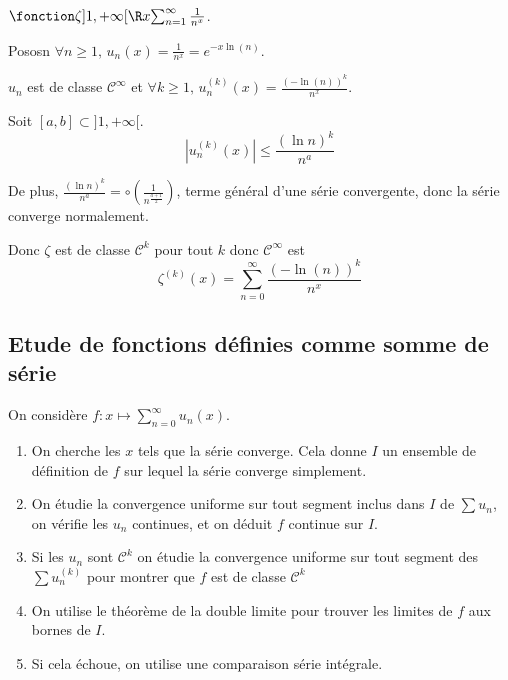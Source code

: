\begin{exemple}
    $\fonction \zeta {]1, + \infty[}{\R} x {\sum_{n = 1}^{\infty} \frac 1 {n^x}}$.

    Pososn $\forall n \geqslant 1, \, u_n(x) = \frac 1 {n^x} = e^{-x \ln(n)}$.

    $u_n$ est de classe $\mathscr {C}^{\infty}$ et $\forall k \geqslant 1, \, u_n^{(k)}(x) = \frac{(- \ln(n))^k}{n^x}$. 

    Soit $[a, b] \subset ]1, +\infty[$.
    $$\left| u_n^{(k)}(x) \right| \leqslant \frac{(\ln n )^k}{n^a}$$

    De plus, $\displaystyle \frac{(\ln n)^k}{n^a} = \circ \left( \frac 1 {n^{\frac{a + 1}{2}}} \right)$, terme 
    général d'une série convergente, donc la série converge normalement. 

    Donc $\zeta$ est de classe $\mathscr{C}^{k}$ pour tout $k$ donc $\mathscr{C}^{\infty}$ est 
    $$\zeta^{(k)}(x) = \sum_{n = 0}^{\infty} \frac{(- \ln(n))^k}{n^x}$$
\end{exemple}

\subsection{Etude de fonctions définies comme somme de série }


On considère $f : \displaystyle x \mapsto \sum_{n = 0}^{\infty} u_n(x)$. 

\begin{enumerate}
    \item On cherche les $x$ tels que la série converge. Cela donne $I$ un ensemble de définition 
    de $f$ sur lequel la série converge simplement.
    \item On étudie la convergence uniforme sur tout segment inclus dans $I$ de $\sum u_n$, on vérifie 
    les $u_n$ continues, et on déduit $f$ continue sur $I$.
    \item Si les $u_n$ sont $\mathscr C^k$ on étudie la convergence uniforme sur tout segment des 
    $\sum u_n^{(k)}$ pour montrer que $f$ est de classe $\mathscr{C}^k$ 
    \item On utilise le théorème de la double limite pour trouver les limites de $f$ aux bornes 
    de $I$. 
    \item Si cela échoue, on utilise une comparaison série intégrale. 
\end{enumerate}

